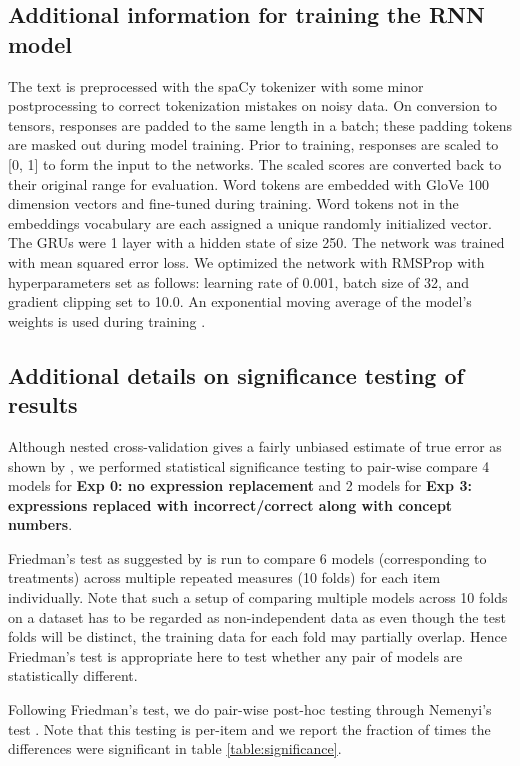 \documentclass[11pt,a4paper]{article}
\begin{document}
\subsection{Additional information for training the RNN model}
The text is preprocessed with the spaCy tokenizer with some minor postprocessing to correct tokenization mistakes on noisy data. On conversion to tensors, responses are padded to the same length in a batch; these padding tokens are masked out during model training. Prior to training, responses are scaled to [0, 1] to form the input to the networks. The scaled scores are converted back to their original range for evaluation. Word tokens are embedded with GloVe 100 dimension vectors and fine-tuned during training. Word tokens not in the embeddings vocabulary are each assigned a unique randomly initialized vector. The GRUs were 1 layer with a hidden state of size 250. The network was trained with mean squared error loss. We optimized the network with RMSProp with hyperparameters set as follows: learning rate of 0.001, batch size of 32, and gradient clipping set to 10.0. An exponential moving average of the model's weights is used during training \cite{adhikari_rethinking_2019}. 


\subsection{Additional details on significance testing of results}
\label{subsection:significance}

Although nested cross-validation gives a fairly unbiased estimate of true error as shown by , we performed statistical significance testing to pair-wise compare 4 models for \textbf{Exp 0: no expression replacement} and 2 models for \textbf{Exp 3: expressions replaced with incorrect/correct along with concept numbers}. 

Friedman's test as suggested by  is run to compare 6 models (corresponding to treatments) across multiple repeated measures (10 folds) for each item individually. Note that such a setup of comparing multiple models across 10 folds on a dataset has to be regarded as non-independent data as even though the test folds will be distinct, the training data for each fold may partially overlap. Hence Friedman's test is appropriate here to test whether any pair of models are statistically different.

Following Friedman's test, we do pair-wise post-hoc testing through Nemenyi's test \cite{nemenyi1963distribution}. Note that this testing is per-item and we report the fraction of times the differences were significant in table \ref{table:significance}.
\end{document}

